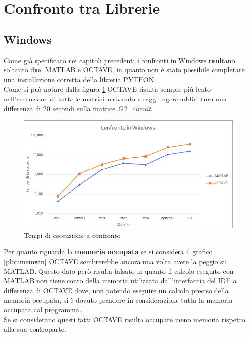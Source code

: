 \documentclass[a4paper,12pt,titlepage,oneside]{book}
\begin{document}
    \newpage
    \section{Confronto tra Librerie}
        \subsection{Windows}
        
        \noindent Come già specificato nei capitoli precedenti i confronti in Windows risultano soltanto due, MATLAB e OCTAVE, in quanto non è stato possibile completare una installazione corretta della libreria PYTHON.\\
        Come si può notare dalla figura \ref{plot:timewin} OCTAVE risulta sempre più lento nell'esecuzione di tutte le matrici arrivando a raggiungere addirittura una differenza di 20 secondi sulla matrice \textit{G3\_circuit}.\\
        
        \begin{figure}[ht]
            \centering
            \includegraphics[scale=0.8]{src/plot/WINtime.png}
            \caption{Tempi di esecuzione a confronto}
            \label{plot:timewin}
        \end{figure}
        
        \noindent Per quanto riguarda la \textbf{memoria occupata} se si considera il grafico \ref{plot:memwin} OCTAVE sembrerebbe ancora una volta avere la peggio su MATLAB. Questo dato però risulta falsato in quanto il calcolo eseguito con MATLAB non tiene conto della memoria utilizzata dall'interfaccia del IDE a differenza di OCTAVE dove, non potendo eseguire un calcolo preciso della memoria occupata, si è dovuto prendere in considerazione tutta la memoria occupata dal programma.\\
        Se si considerano  questi fatti OCTAVE risulta occupare meno memoria rispetto alla sua controparte.\\
        
\end{document}
